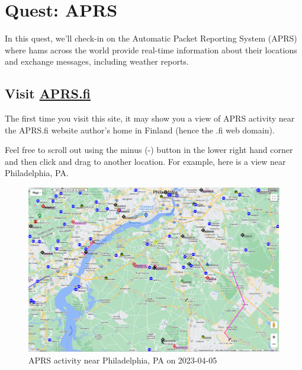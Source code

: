 \documentclass[
  letterpaper,
  DIV=11,
  numbers=noendperiod]{scrreport}
\begin{document}
\hypertarget{quest-aprs}{%
\chapter*{Quest: APRS}\label{quest-aprs}}


In this quest, we'll check-in on the Automatic Packet Reporting System
(APRS) where hams across the world provide real-time information about
their locations and exchange messages, including weather reports.

\hypertarget{visit-aprs.fi}{%
\section*{\texorpdfstring{Visit
\href{https://aprs.fi}{APRS.fi}}{Visit APRS.fi}}\label{visit-aprs.fi}}


The first time you visit this site, it may show you a view of APRS
activity near the APRS.fi website author's home in Finland (hence the
.fi web domain).

Feel free to scroll out using the minus (-) button in the lower right
hand corner and then click and drag to another location. For example,
here is a view near Philadelphia, PA.

\begin{figure}

{\centering \includegraphics[width=1\textwidth,height=\textheight]{include/img/aprs.fi-2023-04-05.png}

}

\caption{APRS activity near Philadelphia, PA on 2023-04-05}

\end{figure}
\end{document}
